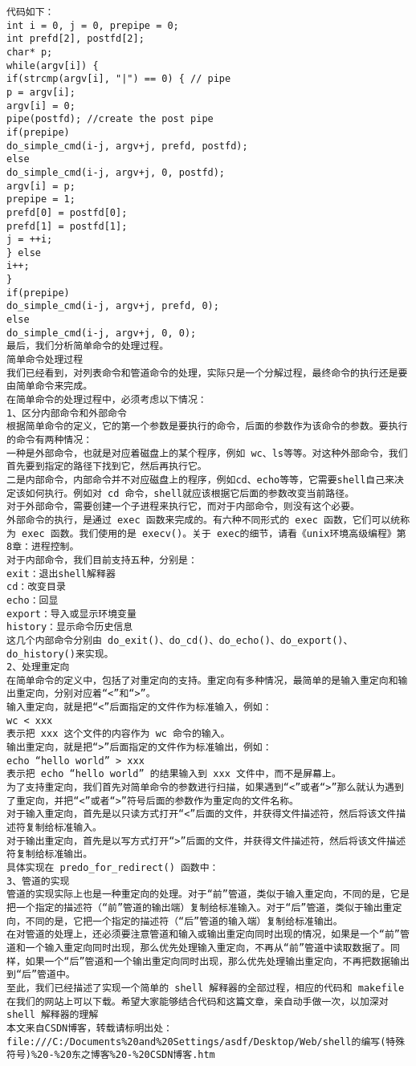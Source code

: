 \begin{lstlisting}
代码如下： 
int i = 0, j = 0, prepipe = 0; 
int prefd[2], postfd[2]; 
char* p; 
while(argv[i]) { 
if(strcmp(argv[i], "|") == 0) { // pipe 
p = argv[i]; 
argv[i] = 0; 
pipe(postfd); //create the post pipe 
if(prepipe) 
do_simple_cmd(i-j, argv+j, prefd, postfd); 
else 
do_simple_cmd(i-j, argv+j, 0, postfd); 
argv[i] = p; 
prepipe = 1; 
prefd[0] = postfd[0]; 
prefd[1] = postfd[1]; 
j = ++i; 
} else 
i++; 
} 
if(prepipe) 
do_simple_cmd(i-j, argv+j, prefd, 0); 
else 
do_simple_cmd(i-j, argv+j, 0, 0); 
最后，我们分析简单命令的处理过程。 
简单命令处理过程 
我们已经看到，对列表命令和管道命令的处理，实际只是一个分解过程，最终命令的执行还是要由简单命令来完成。 
在简单命令的处理过程中，必须考虑以下情况： 
1、区分内部命令和外部命令 
根据简单命令的定义，它的第一个参数是要执行的命令，后面的参数作为该命令的参数。要执行的命令有两种情况： 
一种是外部命令，也就是对应着磁盘上的某个程序，例如 wc、ls等等。对这种外部命令，我们首先要到指定的路径下找到它，然后再执行它。 
二是内部命令，内部命令并不对应磁盘上的程序，例如cd、echo等等，它需要shell自己来决定该如何执行。例如对 cd 命令，shell就应该根据它后面的参数改变当前路径。 
对于外部命令，需要创建一个子进程来执行它，而对于内部命令，则没有这个必要。 
外部命令的执行，是通过 exec 函数来完成的。有六种不同形式的 exec 函数，它们可以统称为 exec 函数。我们使用的是 execv()。关于 exec的细节，请看《unix环境高级编程》第8章：进程控制。 
对于内部命令，我们目前支持五种，分别是： 
exit：退出shell解释器 
cd：改变目录 
echo：回显 
export：导入或显示环境变量 
history：显示命令历史信息 
这几个内部命令分别由 do_exit()、do_cd()、do_echo()、do_export()、do_history()来实现。 
2、处理重定向 
在简单命令的定义中，包括了对重定向的支持。重定向有多种情况，最简单的是输入重定向和输出重定向，分别对应着“<”和“>”。 
输入重定向，就是把“<”后面指定的文件作为标准输入，例如： 
wc < xxx 
表示把 xxx 这个文件的内容作为 wc 命令的输入。 
输出重定向，就是把“>”后面指定的文件作为标准输出，例如： 
echo “hello world” > xxx 
表示把 echo “hello world” 的结果输入到 xxx 文件中，而不是屏幕上。 
为了支持重定向，我们首先对简单命令的参数进行扫描，如果遇到“<”或者“>”那么就认为遇到了重定向，并把“<”或者“>”符号后面的参数作为重定向的文件名称。 
对于输入重定向，首先是以只读方式打开“<”后面的文件，并获得文件描述符，然后将该文件描述符复制给标准输入。 
对于输出重定向，首先是以写方式打开“>”后面的文件，并获得文件描述符，然后将该文件描述符复制给标准输出。 
具体实现在 predo_for_redirect() 函数中： 
3、管道的实现 
管道的实现实际上也是一种重定向的处理。对于“前”管道，类似于输入重定向，不同的是，它是把一个指定的描述符（“前”管道的输出端）复制给标准输入。对于“后”管道，类似于输出重定向，不同的是，它把一个指定的描述符（“后”管道的输入端）复制给标准输出。 
在对管道的处理上，还必须要注意管道和输入或输出重定向同时出现的情况，如果是一个“前”管道和一个输入重定向同时出现，那么优先处理输入重定向，不再从“前”管道中读取数据了。同样，如果一个“后”管道和一个输出重定向同时出现，那么优先处理输出重定向，不再把数据输出到“后”管道中。 
至此，我们已经描述了实现一个简单的 shell 解释器的全部过程，相应的代码和 makefile 在我们的网站上可以下载。希望大家能够结合代码和这篇文章，亲自动手做一次，以加深对shell 解释器的理解 
本文来自CSDN博客，转载请标明出处：file:///C:/Documents%20and%20Settings/asdf/Desktop/Web/shell的编写(特殊符号)%20-%20东之博客%20-%20CSDN博客.htm


\end{lstlisting}
